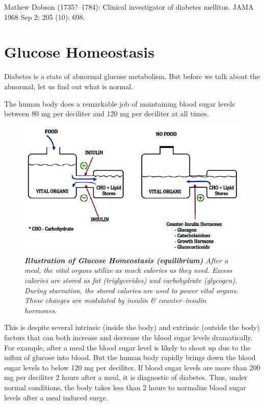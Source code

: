 \begin{thebibliography}{99}
 Mathew Dobson (1735?–1784): Clinical investigator of diabetes mellitus. JAMA 1968 Sep 2; 205 (10): 698.
\end{thebibliography}


\chapter{Glucose Homeostasis}\label{chap2}

Diabetes is a state of abnormal glucose metabolism. But before we talk about the abnormal, let us find out what is normal.

The human body does a remarkable job of maintaining blood sugar levels between 80 mg per deciliter and 120 mg per deciliter at all times.
\begin{figure}[h]
\centering
\includegraphics[scale=1.6]{images/017.jpg}\\
\textit{\textbf{Illustration of Glucose Homeostasis (equilibrium)} After a meal, the vital organs utilize as much calories as they need. Excess calories are stored as fat (triglycerides) and carbobydrate (glycogen). During starvation, the stored calories are used to power vital organs. These changes are modulated by insulin \& counter–insulin hormones.}
\end{figure}
This is despite several intrinsic (inside the body) and extrinsic (outside the body) factors that can both increase and decrease the blood sugar levels dramatically. For example, after a meal the blood sugar level is likely to shoot up due to the influx of glucose into blood. But the human body rapidly brings down the blood sugar levels to below 120 mg per deciliter. If blood sugar levels are more than 200 mg per deciliter 2 hours after a meal, it is diagnostic of diabetes. Thus, under normal conditions, the body takes less than 2 hours to normalize blood sugar levels after a meal induced surge.



